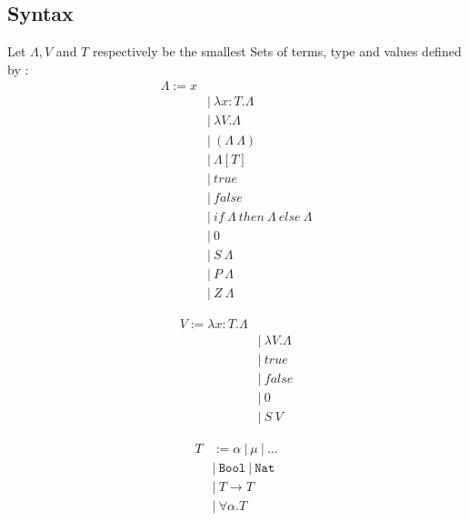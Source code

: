 \documentclass{article}
\begin{document}
    \subsection{Syntax}\label{syntax}
    Let $\Lambda,  V$ and $T$ respectively be the smallest Sets of terms, type and values defined by :
    \begin{align}
        \Lambda := x \tag{variable}\\     
      &|\ \lambda x : T.\Lambda \tag{term abstraction}\\
      &|\ \lambda V.\Lambda \tag{type abstraction}\\
      &|\ (\Lambda \ \Lambda) \tag{term application}\\
      &|\ \Lambda[ T ] \tag{type application}\\
      &|\ true \tag{true}\\
      &|\ false \tag{false}\\
      &|\ if \ \Lambda \  then \  \Lambda \  else \  \Lambda \tag{If then else}\\
      &|\ 0 \tag{Zero}\\
      &|\ S \ \Lambda \tag{Successor}\\
      &|\ P \ \Lambda \tag{Predecessor}\\
      &|\ Z \ \Lambda \tag{Zero predicate}
    \end{align}

    \begin{align}
        V :=  \lambda x : T.\Lambda \tag{term abstraction}\\
    &|\ \lambda V.\Lambda \tag{type abstraction}\\
    &|\ true \tag{Boolean value : true}\\
    &|\ false \tag{Boolean value : false}\\
    &|\ 0 \tag{Natural value : Zero}\\
    &|\ S \ V \tag{Natural value : Non-zero natural number}
    \end{align}

    \begin{align}
        T &:= \alpha \ | \ \mu \ | \  ... \tag{Type variables}\\
        &| \ \texttt{Bool} \ | \ \texttt{Nat} \tag{Base types} \\
        &| \ T\rightarrow T \tag{Arrow types}\\
        &| \ \forall \alpha.T \tag{Quantified types}
    \end{align}
\end{document}
